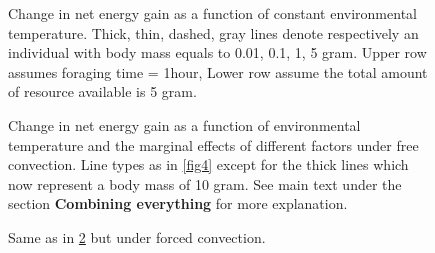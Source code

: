 \begin{figure}[H]
\begin{center}
\caption{
	Change in net energy gain as a function of constant environmental temperature. 
	Thick, thin, dashed, gray lines denote respectively an individual with body mass equals to 0.01, 0.1, 1, 5 gram. 
	Upper row assumes foraging time = 1hour,
	Lower row assume the total amount of resource available is 5 gram.
}%
\label{fig5}
\end{center}
\end{figure}
%
\begin{figure}[H]
\begin{center}
\caption{
	Change in net energy gain as a function of environmental temperature and the marginal effects of different factors under free convection.
	Line types as in \cref{fig4} except for the thick lines which now represent a body mass of 10 gram.
	See main text under the section \textbf{Combining everything} for more explanation.
}%
\label{fig6}
\end{center}
\end{figure}
%
\begin{figure}[H]
\begin{center}
\caption{
	Same as in \cref{fig6} but under forced convection.
}%
\label{fig7}
\end{center}
\end{figure}


